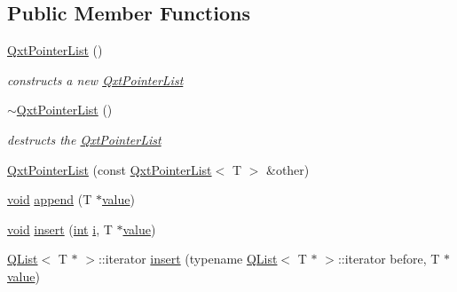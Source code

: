 \subsection*{Public Member Functions}
\begin{DoxyCompactItemize}
\item 
\hyperlink{class_qxt_pointer_list_a64a73141ce01ba1b326b3024f07a645b}{Qxt\-Pointer\-List} ()
\begin{DoxyCompactList}\small\item\em constructs a new \hyperlink{class_qxt_pointer_list}{Qxt\-Pointer\-List} \end{DoxyCompactList}\item 
\hyperlink{class_qxt_pointer_list_aceee9745857605abad1c6d234cf08c88}{$\sim$\-Qxt\-Pointer\-List} ()
\begin{DoxyCompactList}\small\item\em destructs the \hyperlink{class_qxt_pointer_list}{Qxt\-Pointer\-List} \end{DoxyCompactList}\item 
\hyperlink{class_qxt_pointer_list_a41191411f320408a2ca69ba4e285bb18}{Qxt\-Pointer\-List} (const \hyperlink{class_qxt_pointer_list}{Qxt\-Pointer\-List}$<$ T $>$ \&other)
\begin{DoxyCompactList}\small\item\em \end{DoxyCompactList}\item 
\hyperlink{group___u_a_v_objects_plugin_ga444cf2ff3f0ecbe028adce838d373f5c}{void} \hyperlink{class_qxt_pointer_list_a553df0a1f445de8a5d946d49b9b2307d}{append} (T $\ast$\hyperlink{glext_8h_aa0e2e9cea7f208d28acda0480144beb0}{value})
\begin{DoxyCompactList}\small\item\em \end{DoxyCompactList}\item 
\hyperlink{group___u_a_v_objects_plugin_ga444cf2ff3f0ecbe028adce838d373f5c}{void} \hyperlink{class_qxt_pointer_list_a29f78275547fb400625a9a92cf8c6d44}{insert} (\hyperlink{ioapi_8h_a787fa3cf048117ba7123753c1e74fcd6}{int} \hyperlink{uavobjecttemplate_8m_a6f6ccfcf58b31cb6412107d9d5281426}{i}, T $\ast$\hyperlink{glext_8h_aa0e2e9cea7f208d28acda0480144beb0}{value})
\begin{DoxyCompactList}\small\item\em \end{DoxyCompactList}\item 
\hyperlink{class_q_list}{Q\-List}$<$ T $\ast$ $>$\-::iterator \hyperlink{class_qxt_pointer_list_a9d3a8f5c7cfe317a1d1c9a4f45b4c61d}{insert} (typename \hyperlink{class_q_list}{Q\-List}$<$ T $\ast$ $>$\-::iterator before, T $\ast$\hyperlink{glext_8h_aa0e2e9cea7f208d28acda0480144beb0}{value})

\end{DoxyCompactItemize}
